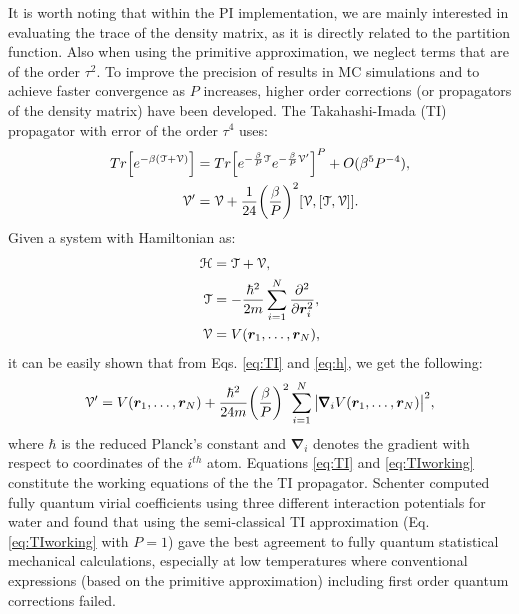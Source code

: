         It is worth noting that within the PI implementation, we are mainly interested in evaluating the trace of the density matrix, as it is directly related to the partition function. Also when using the primitive approximation, we neglect terms that are of the order $\tau^2$. To improve the precision of results in MC simulations and to achieve faster convergence as $P$ increases, higher order corrections (or propagators of the density matrix) have been developed. The Takahashi-Imada (TI) propagator \cite{Takahashi1984} with error of the order $\tau^4$ uses:
        \begin{equation}\label{eq:TI}
            \begin{aligned}
                Tr \Big[ e^{- \beta ( \text{$\mathcal{T}$} + \text{$\mathcal{V}$} )} \Big] &= Tr \Big[ e^{ -\frac{\beta}{P} \text{$\mathcal{T}$}} e^{-\frac{\beta}{P} \mathcal{V'}} \Big]^P + O (\beta^5 P^{-4}),\\
                \mathcal{V'} &= \text{$\mathcal{V}$} + \frac{1}{24} \bigg( \frac{\beta}{P} \bigg)^2 [\text{$\mathcal{V}$}, [\text{$\mathcal{T}$}, \text{$\mathcal{V}$}]].
            \end{aligned}
        \end{equation}
        Given a system with Hamiltonian  as:
        \begin{equation}\label{eq:h}
            \begin{aligned}
                \text{$\mathcal{H}$} &= \text{$\mathcal{T}$} + \text{$\mathcal{V}$},\\
                \text{$\mathcal{T}$} &= -\displaystyle\frac{\hbar^2}{2m} \sum\limits_{i=1}^N \frac{\partial^2}{\partial \bm{r}_i^2},\\
                \text{$\mathcal{V}$} &= V (\bm{r}_1, \ldots , \bm{r}_N),
            \end{aligned}
        \end{equation}
        it can be easily shown that from Eqs. \eqref{eq:TI} and \eqref{eq:h}, we get the following:
        \begin{equation}\label{eq:TIworking}
            \mathcal{V'} = V (\bm{r}_1, \ldots ,\bm{r}_N) + \frac{\hbar^2}{24m} \bigg(\frac{\beta}{P} \bigg)^2 \displaystyle\sum\limits_{i=1}^N \big|\pmb{\nabla}_i V (\bm{r}_1, \ldots ,\bm{r}_N) \big|^2,
        \end{equation}
        where $\hbar$ is the reduced Planck's constant and $\pmb{\nabla}_i$ denotes the gradient with respect to coordinates of the $i^{th}$ atom. Equations \eqref{eq:TI} and \eqref{eq:TIworking} constitute the working equations of the the TI propagator. Schenter \cite{Schenter2002} computed fully quantum virial coefficients using three different interaction potentials for water and found that using the semi-classical TI approximation (Eq. \eqref{eq:TIworking} with $P = 1$) gave the best agreement to fully quantum statistical mechanical calculations, especially at low temperatures where conventional expressions (based on the primitive approximation) including first order quantum corrections failed.

